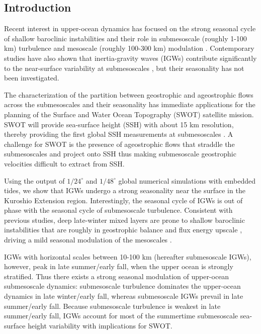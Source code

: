 \documentclass[grl]{agutex2015}
\begin{document}
\begin{article}

%
%

\section{Introduction}

Recent interest in upper-ocean dynamics has focused on the strong seasonal
cycle of shallow baroclinic instabilities and their role in submesoscale (roughly 1-100 km)
turbulence and mesoscale (roughly 100-300 km) modulation \citep{sasaki_etal2014,qiu_etal2014,
brannigan_etal2015,callies_etal2015, thompson_etal2016,buckingham_etal2016}. Contemporary studies
have also shown that inertia-gravity waves (IGWs) contribute significantly
to the near-surface variability at submesoscales \citep{richman_etal2012,
buhler_etal2014,rocha_etal2016}, but their seasonality has not been investigated.

The characterization of the partition between geostrophic and ageostrophic flows across
the submesoscales and their seasonality has immediate applications for the planning
of the Surface and Water Ocean Topography (SWOT) satellite mission.
SWOT will provide
sea-surface height (SSH) with about 15 km resolution, thereby providing the
first global SSH measurements at submesoscales \citep{fu_ubelmann2014}. A
challenge for SWOT is the presence of ageostrophic flows that straddle the submesoscales and project
onto SSH \citep[e.g., ][]{richman_etal2012} thus making submesoscale geostrophic
velocities difficult to extract from SSH.

Using the output of $1/24^\circ$ and $1/48^\circ$ global
numerical simulations with embedded tides, we show that IGWs undergo
a strong seasonality near the surface in the Kuroshio Extension region.
Interestingly, the seasonal cycle of IGWs is out of phase
with the seasonal cycle of submesoscale turbulence. Consistent with previous studies,
deep late-winter mixed layers are prone to
shallow baroclinic instabilities that are roughly in geostrophic balance
and flux energy upscale \citep{sasaki_etal2014,callies_etal2016},
driving a mild seasonal modulation of the mesoscales \citep{sasaki_etal2014,qiu_etal2014}.

IGWs with horizontal scales between 10-100 km (hereafter submesoscale IGWs),
however, peak in late summer/early fall,
when the upper ocean is strongly stratified. Thus there exists a
strong seasonal modulation of upper-ocean submesoscale dynamics:
submesoscale turbulence dominates the upper-ocean dynamics in late winter/early fall,
whereas submesoscale IGWs prevail in late summer/early fall.
Because submesoscale turbulence is weakest in late summer/early fall,
IGWs account for most of the
summertime submesoscale sea-surface height variability with implications for SWOT.


\end{article}
\end{document}
